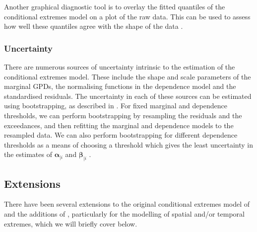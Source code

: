 \documentclass{article}
\numberwithin{equation}{section}
\begin{document}
Another graphical diagnostic tool is to overlay the fitted quantiles of the conditional extremes model on a plot of the raw data. 
This can be used to assess how well these quantiles agree with the shape of the data \citep{Southworth2024_vignette}.


\subsubsection{Uncertainty} \label{subsubsec:ce_uncertainty}


There are numerous sources of uncertainty intrinsic to the estimation of the conditional extremes model.
These include the shape and scale parameters of the marginal GPDs, the normalising functions in the dependence model and the standardised residuals. 
The uncertainty in each of these sources can be estimated using bootstrapping, as described in \citet{Heffernan2004}.
For fixed marginal and dependence thresholds, we can perform bootstrapping by resampling the residuals and the exceedances, and then refitting the marginal and dependence models to the resampled data.
We can also perform bootstrapping for different dependence thresholds as a means of choosing a threshold which gives the least uncertainty in the estimates of $\bm{\alpha}_{\mid i}$ and $\bm{\beta}_{\mid i}$ \citep{Southworth2024_vignette}.

\subsection{Extensions} \label{subsec:extensions}

There have been several extensions to the original conditional extremes model of \cite{Heffernan2004} and the additions of \cite{Keef2013}, particularly for the modelling of spatial and/or temporal extremes, which we will briefly cover below. 
\end{document}
